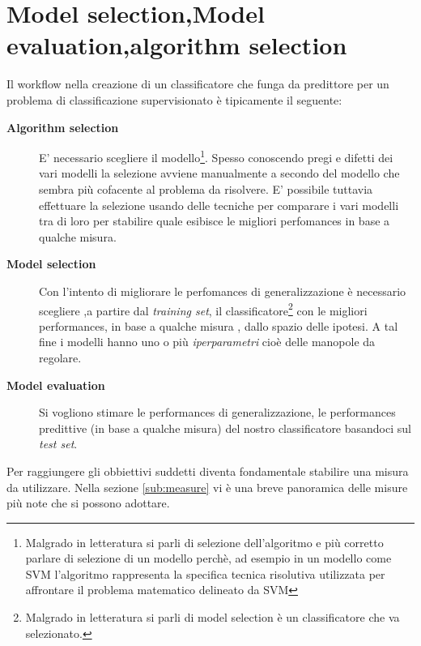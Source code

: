 \section[Tecniche selezione class.]{Model selection,Model evaluation,algorithm selection}
Il workflow nella creazione di un classificatore che funga da predittore per un problema di classificazione supervisionato è tipicamente il seguente:
\begin{description}
\item[\textbf{Algorithm selection}] E' necessario scegliere il modello\footnote{Malgrado in letteratura si parli di selezione dell'algoritmo e più corretto parlare di selezione di un modello perchè, ad esempio in un modello come \ac{SVM} l'algoritmo rappresenta la specifica tecnica risolutiva utilizzata per affrontare il problema matematico delineato da \ac{SVM}}. Spesso conoscendo pregi e difetti dei vari modelli la selezione avviene manualmente a secondo del modello che sembra più cofacente al problema da risolvere. E' possibile tuttavia effettuare la selezione usando delle tecniche per comparare i vari modelli tra di loro per stabilire quale esibisce le migliori perfomances in base a qualche misura.
\item[\textbf{Model selection}] Con l'intento di migliorare le perfomances di generalizzazione è necessario scegliere ,a partire dal \textit{training set}, il classificatore\footnote{Malgrado in letteratura si parli di model selection è un classificatore che va selezionato.} con le migliori performances, in base a qualche misura , dallo spazio delle ipotesi. A tal fine  i modelli hanno uno o più \textit{iperparametri} cioè delle manopole da regolare.
\item[\textbf{Model evaluation}] Si vogliono stimare le performances di generalizzazione, le performances predittive (in base a qualche misura) del nostro classificatore basandoci sul \textit{test set}.
\end{description}
Per raggiungere gli obbiettivi suddetti diventa fondamentale stabilire una misura da utilizzare. Nella sezione \ref{sub:measure} vi è una breve panoramica delle misure più note che si possono adottare.

